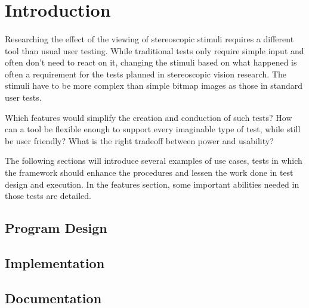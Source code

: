 \section{Introduction\label{Introduction}}
\paragraph{}
Researching the effect of the viewing of stereoscopic stimuli requires a different tool than usual user testing.
While traditional tests only require simple input and often don't need to react on it, changing the stimuli based on what happened is often a requirement for the tests planned in stereoscopic vision research.
The stimuli have to be more complex than simple bitmap images as those in standard user tests.

Which features would simplify the creation and conduction of such tests?
How can a tool be flexible enough to support every imaginable type of test, while still be user friendly?
What is the right tradeoff between power and usability?

The following sections will introduce several examples of use cases, tests in which the framework should enhance the procedures and lessen the work done in test design and execution.
In the features section, some important abilities needed in those tests are detailed.


\subsection{Program Design}
\paragraph{}

\subsection{Implementation}
\paragraph{}

\subsection{Documentation}
\paragraph{}

